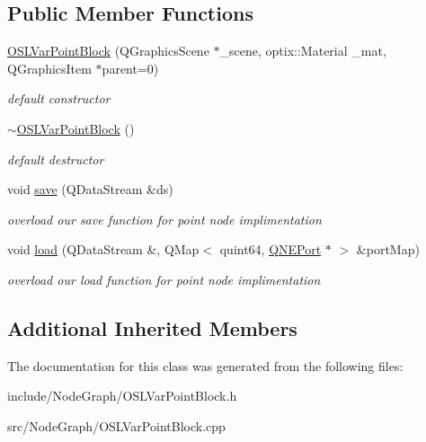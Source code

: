 \subsection*{Public Member Functions}
\begin{DoxyCompactItemize}
\item 
\hypertarget{class_o_s_l_var_point_block_a8fe3a3a231deb2e939cbe03e5b243024}{\hyperlink{class_o_s_l_var_point_block_a8fe3a3a231deb2e939cbe03e5b243024}{O\-S\-L\-Var\-Point\-Block} (Q\-Graphics\-Scene $\ast$\-\_\-scene, optix\-::\-Material \-\_\-mat, Q\-Graphics\-Item $\ast$parent=0)}\label{class_o_s_l_var_point_block_a8fe3a3a231deb2e939cbe03e5b243024}

\begin{DoxyCompactList}\small\item\em default constructor \end{DoxyCompactList}\item 
\hypertarget{class_o_s_l_var_point_block_a6e0e854dda16fcfc0c64f481ecf44d09}{\hyperlink{class_o_s_l_var_point_block_a6e0e854dda16fcfc0c64f481ecf44d09}{$\sim$\-O\-S\-L\-Var\-Point\-Block} ()}\label{class_o_s_l_var_point_block_a6e0e854dda16fcfc0c64f481ecf44d09}

\begin{DoxyCompactList}\small\item\em default destructor \end{DoxyCompactList}\item 
\hypertarget{class_o_s_l_var_point_block_a1bde112b0f96c07dff388db02094c547}{void \hyperlink{class_o_s_l_var_point_block_a1bde112b0f96c07dff388db02094c547}{save} (Q\-Data\-Stream \&ds)}\label{class_o_s_l_var_point_block_a1bde112b0f96c07dff388db02094c547}

\begin{DoxyCompactList}\small\item\em overload our save function for point node implimentation \end{DoxyCompactList}\item 
\hypertarget{class_o_s_l_var_point_block_a47092371b17447b6ddb9b16af2253463}{void \hyperlink{class_o_s_l_var_point_block_a47092371b17447b6ddb9b16af2253463}{load} (Q\-Data\-Stream \&, Q\-Map$<$ quint64, \hyperlink{class_q_n_e_port}{Q\-N\-E\-Port} $\ast$ $>$ \&port\-Map)}\label{class_o_s_l_var_point_block_a47092371b17447b6ddb9b16af2253463}

\begin{DoxyCompactList}\small\item\em overload our load function for point node implimentation \end{DoxyCompactList}\end{DoxyCompactItemize}
\subsection*{Additional Inherited Members}


The documentation for this class was generated from the following files\-:\begin{DoxyCompactItemize}
\item 
include/\-Node\-Graph/O\-S\-L\-Var\-Point\-Block.\-h\item 
src/\-Node\-Graph/O\-S\-L\-Var\-Point\-Block.\-cpp\end{DoxyCompactItemize}

